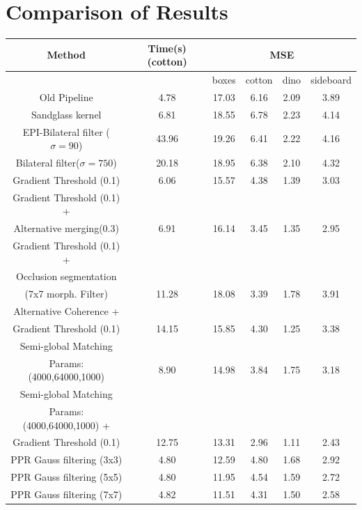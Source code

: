 \documentclass  [
  paper    = a4,
  BCOR     = 10mm,
  twoside,
  fontsize = 12pt,
  fleqn,
  toc      = bibnumbered,
  toc      = listofnumbered,
  numbers  = noendperiod,
  headings = normal,
  listof   = leveldown,
  version  = 3.03
]                                       {scrreprt}
\begin{document}
\section{Comparison of Results}
\begin{table}
	\centering
	\begin{tabular}{|c|c|c|c|c|c|}
		\hline 
		Method & Time(s) (cotton) & \multicolumn{4}{c|}{MSE} \\ 
		\hline 
		&  & boxes & cotton & dino & sideboard \\ 
		\hline
		Old Pipeline & 4.78 & 17.03 & 6.16 & 2.09 & 3.89 \\
		\hline 
		Sandglass kernel & 6.81  & 18.55  & 6.78  & 2.23  & 4.14 \\ 
		\hline 
		EPI-Bilateral filter ($\sigma = 90$) &  43.96 &  19.26  & 6.41  & 2.22  & 4.16  \\ 
		\hline 
		Bilateral filter($\sigma = 750$) & 20.18  & 18.95  &  6.38 & 2.10  &4.32  \\ 
		\hline 
		Gradient Threshold (0.1) & 6.06 & 15.57  & 4.38  & 1.39  & 3.03  \\ 
		\hline 
		Gradient Threshold (0.1) +&&&&&\\
		 Alternative merging(0.3) & 6.91 & 16.14 & 3.45 & 1.35 & 2.95 \\
		\hline
		Gradient Threshold (0.1) + &&&&&\\Occlusion segmentation&&&&&\\(7x7 morph. Filter) & 11.28  & 18.08 &  3.39 & 1.78  & 3.91  \\ 
		\hline 
		Alternative Coherence +&&&&&\\Gradient Threshold (0.1) & 14.15  & 15.85  & 4.30  & 1.25  & 3.38  \\ 
		\hline 
		Semi-global Matching&&&&&\\
		Params: (4000,64000,1000) & 8.90 & 14.98  & 3.84  & 1.75  & 3.18  \\ 
		\hline 
		Semi-global Matching&&&&&\\
		Params: (4000,64000,1000) +&&&&&\\
		Gradient Threshold (0.1) & 12.75  & 13.31  & 2.96   & 1.11   & 2.43 \\ 
		\hline 
		\hline
		PPR Gauss filtering (3x3) & 4.80 & 12.59 & 4.80 & 1.68 & 2.92 \\
		\hline
		PPR Gauss filtering (5x5) &4.80 & 11.95 & 4.54 & 1.59 &  2.72 \\
		\hline 
		PPR Gauss filtering (7x7) & 4.82& 11.51 & 4.31 & 1.50 & 2.58 \\

\end{tabular}
\end{table}
\end{document}

